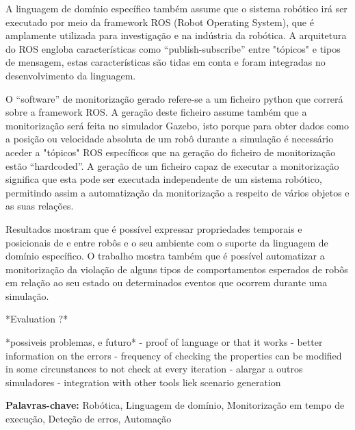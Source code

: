 A linguagem de domínio específico também assume que o sistema robótico irá ser executado por meio da framework ROS (Robot Operating System), que é amplamente utilizada para investigação e na indústria da robótica. A arquitetura do ROS engloba características como “publish-subscribe” entre "tópicos" e tipos de mensagem, estas características são tidas em conta e foram integradas no desenvolvimento da linguagem.

O “software” de monitorização gerado refere-se a um ficheiro python que correrá sobre a framework ROS. A geração deste ficheiro assume também que a monitorização será feita no simulador Gazebo, isto porque para obter dados como a posição ou velocidade absoluta de um robô durante a simulação é necessário aceder a "tópicos" ROS específicos que na geração do ficheiro de monitorização estão “hardcoded”. A geração de um ficheiro capaz de executar a monitorização significa que esta pode ser executada independente de um sistema robótico, permitindo assim a automatização da monitorização a respeito de vários objetos e as suas relações.

Resultados mostram que é possível expressar propriedades temporais e posicionais de e entre robôs e o seu ambiente com o suporte da linguagem de domínio específico. O trabalho mostra também que é possível automatizar a monitorização da violação de alguns tipos de comportamentos esperados de robôs em relação ao seu estado ou determinados eventos que ocorrem durante uma simulação.

*Evaluation ?*

*possiveis problemas, e futuro* - proof of language or that it works - better information on the errors - frequency of checking the properties can be modified in some circunstances to not check at every iteration - alargar a outros simuladores - integration with other tools liek scenario generation


\vfill

\begin{flushleft}
\textbf{Palavras-chave:}
Robótica, Linguagem de domínio, Monitorização em tempo de execução, Deteção de erros, Automação
\end{flushleft}

